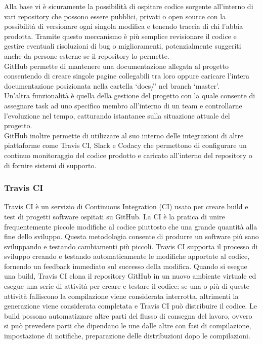 Alla base vi è sicuramente la possibilità di ospitare codice sorgente all'interno di vari repository che possono essere pubblici, privati o open source con la possibilità di versionare ogni singola modifica e tenendo traccia di chi l'abbia prodotta.
Tramite questo meccanismo è più semplice revisionare il codice e gestire eventuali risoluzioni di bug o miglioramenti, potenzialmente suggeriti anche da persone esterne se il repository lo permette.
\\
GitHub permette di mantenere una documentazione allegata al progetto consentendo di creare singole pagine collegabili tra loro oppure caricare l'intera documentazione posizionata nella cartella `docs/' nel branch `master'.
\\
Un'altra funzionalità è quella della gestione del progetto con la quale consente di assegnare task ad uno specifico membro all'interno di un team e controllarne l'evoluzione nel tempo, catturando istantanee sulla situazione attuale del progetto.
\\
GitHub inoltre permette di utilizzare al suo interno delle integrazioni di altre piattaforme come Travis CI,  Slack e Codacy che permettono di configurare un continuo monitoraggio del codice prodotto e caricato all'interno del repository o di fornire sistemi di supporto.

\subsubsection{Travis CI}
Travis CI è un servizio di Continuous Integration (CI) usato per creare build e test di progetti software ospitati su GitHub.
La CI è la pratica di unire frequentemente piccole modifiche al codice piuttosto che una grande quantità alla fine dello sviluppo. Questa metodologia consente di produrre un software più sano sviluppando e testando cambiamenti più piccoli.
Travis CI supporta il processo di sviluppo creando e testando automaticamente le modifiche apportate al codice, fornendo un feedback immediato sul successo della modifica.
Quando si esegue una build, Travis CI clona il repository GitHub in un nuovo ambiente virtuale ed esegue una serie di attività per creare e testare il codice: se una o più di queste attività falliscono la compilazione viene considerata interrotta, altrimenti la generazione viene considerata completata e Travis CI può distribuire il codice.
Le build possono automatizzare altre parti del flusso di consegna del lavoro, ovvero si può prevedere parti che dipendano le une dalle altre con fasi di compilazione, impostazione di notifiche, preparazione delle distribuzioni dopo le compilazioni.


